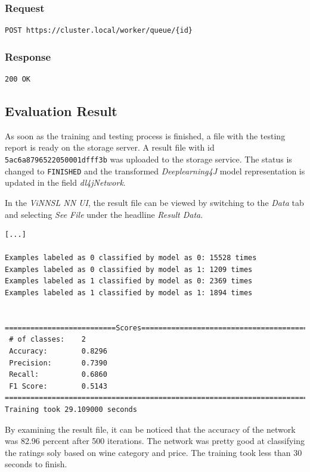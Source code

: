 \subsubsection{Request}\label{request-5}

\begin{verbatim}
POST https://cluster.local/worker/queue/{id}
\end{verbatim}

\subsubsection{Response}\label{response-5}

\begin{verbatim}
200 OK
\end{verbatim}

\subsection{Evaluation Result}\label{evaluation-result-1}

As soon as the training and testing process is finished, a file with the
testing report is ready on the storage server. A result file with id
\texttt{5ac6a8796522050001dfff3b} was uploaded to the storage service.
The status is changed to \texttt{FINISHED} and the transformed
\emph{Deeplearning4J} model representation is updated in the field
\emph{dl4jNetwork}.

In the \emph{ViNNSL NN UI}, the result file can be viewed by switching
to the \emph{Data} tab and selecting \emph{See File} under the headline
\emph{Result Data}.

\begin{verbatim}
[...]

Examples labeled as 0 classified by model as 0: 15528 times
Examples labeled as 0 classified by model as 1: 1209 times
Examples labeled as 1 classified by model as 0: 2369 times
Examples labeled as 1 classified by model as 1: 1894 times


==========================Scores========================================
 # of classes:    2
 Accuracy:        0.8296
 Precision:       0.7390
 Recall:          0.6860
 F1 Score:        0.5143
========================================================================
Training took 29.109000 seconds
\end{verbatim}

By examining the result file, it can be noticed that the accuracy of the
network was 82.96 percent after 500 iterations. The network was pretty
good at classifying the ratings soly based on wine category and price.
The training took less than 30 seconds to finish.

